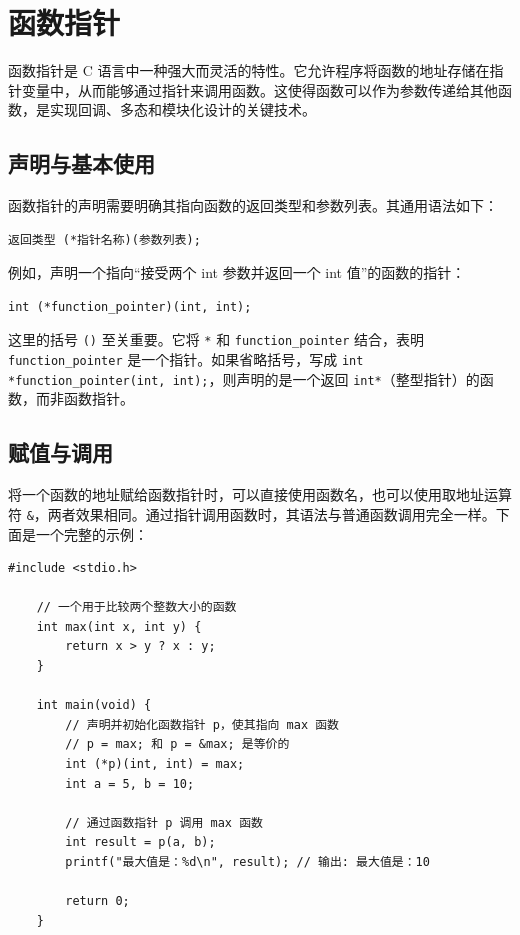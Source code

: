 \section{函数指针} \label{sec:func-pointer}

函数指针是 C 语言中一种强大而灵活的特性。它允许程序将函数的地址存储在指针变量中，从而能够通过指针来调用函数。这使得函数可以作为参数传递给其他函数，是实现回调、多态和模块化设计的关键技术。

\subsection{声明与基本使用}

函数指针的声明需要明确其指向函数的返回类型和参数列表。其通用语法如下：

\begin{lstlisting}[style=c]
	返回类型 (*指针名称)(参数列表);
\end{lstlisting}

例如，声明一个指向“接受两个 int 参数并返回一个 int 值”的函数的指针：

\begin{lstlisting}[style=c]
	int (*function_pointer)(int, int);
\end{lstlisting}

这里的括号 \texttt{()} 至关重要。它将 \texttt{*} 和 \texttt{function\_pointer} 结合，表明 \texttt{function\_pointer} 是一个指针。如果省略括号，写成 \texttt{int *function\_pointer(int, int);}，则声明的是一个返回 \texttt{int*}（整型指针）的函数，而非函数指针。

\subsection{赋值与调用}

将一个函数的地址赋给函数指针时，可以直接使用函数名，也可以使用取地址运算符 \texttt{\&}，两者效果相同。通过指针调用函数时，其语法与普通函数调用完全一样。下面是一个完整的示例：

\begin{lstlisting}[style=c]
	#include <stdio.h>
	
	// 一个用于比较两个整数大小的函数
	int max(int x, int y) {
		return x > y ? x : y;
	}
	
	int main(void) {
		// 声明并初始化函数指针 p，使其指向 max 函数
		// p = max; 和 p = &max; 是等价的
		int (*p)(int, int) = max;
		int a = 5, b = 10;
		
		// 通过函数指针 p 调用 max 函数
		int result = p(a, b);
		printf("最大值是：%d\n", result); // 输出: 最大值是：10
		
		return 0;
	}
\end{lstlisting}

